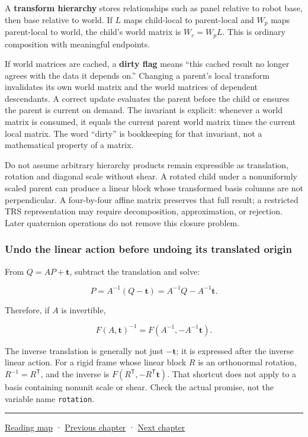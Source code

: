 A \textbf{transform hierarchy} stores relationships such as panel relative to robot base, then base relative to world. If \(L\) maps child-local to parent-local and \(W_p\) maps parent-local to world, the child's world matrix is \(W_c=W_pL\). This is ordinary composition with meaningful endpoints.

If world matrices are cached, a \textbf{dirty flag} means ``this cached result no longer agrees with the data it depends on.'' Changing a parent's local transform invalidates its own world matrix and the world matrices of dependent descendants. A correct update evaluates the parent before the child or ensures the parent is current on demand. The invariant is explicit: whenever a world matrix is consumed, it equals the current parent world matrix times the current local matrix. The word ``dirty'' is bookkeeping for that invariant, not a mathematical property of a matrix.

Do not assume arbitrary hierarchy products remain expressible as translation, rotation and diagonal scale without shear. A rotated child under a nonuniformly scaled parent can produce a linear block whose transformed basis columns are not perpendicular. A four-by-four affine matrix preserves that full result; a restricted TRS representation may require decomposition, approximation, or rejection. Later quaternion operations do not remove this closure problem.

\subsubsection{Undo the linear action before undoing its translated origin}\label{01-foundations-i-ch018-undo-the-linear-action-before-undoing-its-translated-origin}

\hypertarget{01-foundations-i-ch018-undo-the-linear-action-before-undoing-its-translated-origin}{}

From \(Q=AP+\mathbf t\), subtract the translation and solve:

\[
P=A^{-1}(Q-\mathbf t)=A^{-1}Q-A^{-1}\mathbf t.
\]

Therefore, if \(A\) is invertible,

\[
F(A,\mathbf t)^{-1}
=F(A^{-1},-A^{-1}\mathbf t).
\]

The inverse translation is generally not just \(-\mathbf t\); it is expressed after the inverse linear action. For a rigid frame whose linear block \(R\) is an orthonormal rotation, \(R^{-1}=R^{\mathsf T}\), and the inverse is \(F(R^{\mathsf T},-R^{\mathsf T}\mathbf t)\). That shortcut does not apply to a basis containing nonunit scale or shear. Check the actual promise, not the variable name \texttt{rotation}.

\begin{center}\rule{0.5\linewidth}{0.5pt}\end{center}

\hyperref[volume-reading-map]{Reading map} · \hyperref[01-foundations-i-ch017-python-and-numerical-tools-for-graphics-systems]{Previous chapter} · \hyperref[01-foundations-i-ch019-coordinate-frames-and-linear-systems]{Next chapter}
